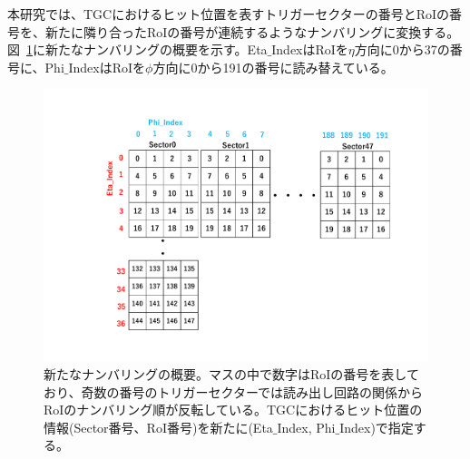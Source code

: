 本研究では、TGCにおけるヒット位置を表すトリガーセクターの番号とRoIの番号を、新たに隣り合ったRoIの番号が連続するようなナンバリングに変換する。
図~\ref{fig:newnumbering}に新たなナンバリングの概要を示す。Eta$\_$IndexはRoIを$\eta$方向に0から37の番号に、Phi$\_$IndexはRoIを$\phi$方向に0から191の番号に読み替えている。
\begin{figure}[tb]
  \centering
  \includegraphics[clip, width=14cm]{fig/4/new_numbering.pdf}
  \caption{新たなナンバリングの概要。マスの中で数字はRoIの番号を表しており、奇数の番号のトリガーセクターでは読み出し回路の関係からRoIのナンバリング順が反転している。TGCにおけるヒット位置の情報(Sector番号、RoI番号)を新たに(Eta$\_$Index, Phi$\_$Index)で指定する。}
  \label{fig:newnumbering}
\end{figure}

